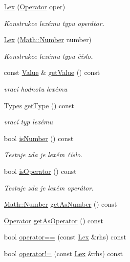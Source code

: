\begin{DoxyCompactItemize}
\item 
\hyperlink{classteam22_1_1_calc_1_1_lex_a12b6acfadebf09ce47319315f8a2e684}{Lex} (\hyperlink{classteam22_1_1_calc_1_1_lex_a61d29fc4878a3b36d2de2f13c56ed932}{Operator} oper)
\begin{DoxyCompactList}\small\item\em Konstrukce lexému typu operátor. \end{DoxyCompactList}\item 
\hyperlink{classteam22_1_1_calc_1_1_lex_a95deefe4c4e987fef602fbd621bac095}{Lex} (\hyperlink{classteam22_1_1_math_1_1_number}{Math\+::\+Number} number)
\begin{DoxyCompactList}\small\item\em Konstrukce lexému typu číslo. \end{DoxyCompactList}\item 
const \hyperlink{unionteam22_1_1_calc_1_1_lex_1_1_value}{Value} \& \hyperlink{classteam22_1_1_calc_1_1_lex_a8a68cd13a68d32d50d3b014ca4478fab}{get\+Value} () const
\begin{DoxyCompactList}\small\item\em vrací hodnotu lexému \end{DoxyCompactList}\item 
\hyperlink{classteam22_1_1_calc_1_1_lex_a295984577c98a23ddd20ee36d33145a2}{Types} \hyperlink{classteam22_1_1_calc_1_1_lex_ae82ccde78beed14c45df1e747ed21bcb}{get\+Type} () const
\begin{DoxyCompactList}\small\item\em vrací typ lexému \end{DoxyCompactList}\item 
bool \hyperlink{classteam22_1_1_calc_1_1_lex_a21f9fe1956185bfb6d80d094846a44f1}{is\+Number} () const
\begin{DoxyCompactList}\small\item\em Testuje zda je lexém číslo. \end{DoxyCompactList}\item 
bool \hyperlink{classteam22_1_1_calc_1_1_lex_a965eff3f3264440279ea9a1f1d3a3cfe}{is\+Operator} () const
\begin{DoxyCompactList}\small\item\em Testuje zda je lexém operátor. \end{DoxyCompactList}\item 
\hyperlink{classteam22_1_1_math_1_1_number}{Math\+::\+Number} \hyperlink{classteam22_1_1_calc_1_1_lex_a794e75373451a906a2cfc60e5d6b1996}{get\+As\+Number} () const
\item 
\hyperlink{classteam22_1_1_calc_1_1_lex_a61d29fc4878a3b36d2de2f13c56ed932}{Operator} \hyperlink{classteam22_1_1_calc_1_1_lex_afdeee7e9b13fcb9826d4d8fd7d5f141f}{get\+As\+Operator} () const
\item 
bool \hyperlink{classteam22_1_1_calc_1_1_lex_a55858e2719cb121fccff59eed42dd692}{operator==} (const \hyperlink{classteam22_1_1_calc_1_1_lex}{Lex} \&rhs) const
\item 
bool \hyperlink{classteam22_1_1_calc_1_1_lex_a25b4f3b98b68c4d967eb3695efc78667}{operator!=} (const \hyperlink{classteam22_1_1_calc_1_1_lex}{Lex} \&rhs) const
\end{DoxyCompactItemize}
